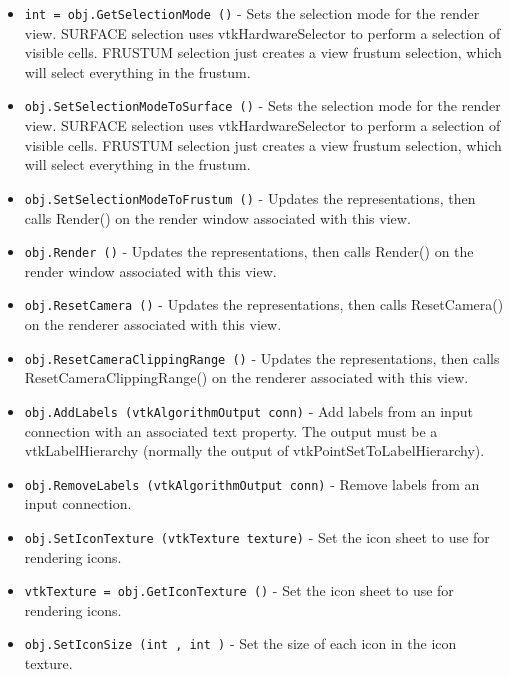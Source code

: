 \begin{itemize}
\item  \verb|int = obj.GetSelectionMode ()| -  Sets the selection mode for the render view.
 SURFACE selection uses vtkHardwareSelector to perform a selection
 of visible cells.
 FRUSTUM selection just creates a view frustum selection, which will
 select everything in the frustum.

\item  \verb|obj.SetSelectionModeToSurface ()| -  Sets the selection mode for the render view.
 SURFACE selection uses vtkHardwareSelector to perform a selection
 of visible cells.
 FRUSTUM selection just creates a view frustum selection, which will
 select everything in the frustum.

\item  \verb|obj.SetSelectionModeToFrustum ()| -  Updates the representations, then calls Render() on the render window
 associated with this view.

\item  \verb|obj.Render ()| -  Updates the representations, then calls Render() on the render window
 associated with this view.

\item  \verb|obj.ResetCamera ()| -  Updates the representations, then calls ResetCamera() on the renderer
 associated with this view.

\item  \verb|obj.ResetCameraClippingRange ()| -  Updates the representations, then calls ResetCameraClippingRange() on the renderer
 associated with this view.

\item  \verb|obj.AddLabels (vtkAlgorithmOutput conn)| -  Add labels from an input connection with an associated text
 property. The output must be a vtkLabelHierarchy (normally the
 output of vtkPointSetToLabelHierarchy).

\item  \verb|obj.RemoveLabels (vtkAlgorithmOutput conn)| -  Remove labels from an input connection.

\item  \verb|obj.SetIconTexture (vtkTexture texture)| -  Set the icon sheet to use for rendering icons.

\item  \verb|vtkTexture = obj.GetIconTexture ()| -  Set the icon sheet to use for rendering icons.

\item  \verb|obj.SetIconSize (int , int )| -  Set the size of each icon in the icon texture.


\end{itemize}
